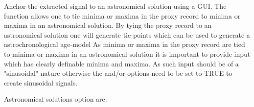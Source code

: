 \documentclass[a4paper]{book}
\begin{document}
%
\begin{Description}
Anchor the extracted signal to an astronomical solution using a GUI.
The  function allows one to tie minima or maxima in the proxy record
to minima or maxima in an astronomical solution.
By tying the proxy record to an astronomical solution one will generate tie-points which
can be used to generate a astrochronological age-model
As minima or maxima in the proxy record are tied to minima or maxima in an astronomical solution it is
important to provide input which has clearly definable minima and maxima.
As such input should be of a "sinusoidal" nature otherwise the 
and/or  options need to be set to TRUE to create sinusoidal signals.

Astronomical solutions option are:
\begin{itemize}


\end{itemize}
\end{Description}
\end{document}
